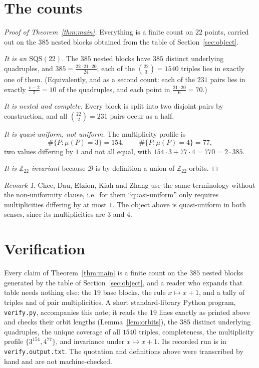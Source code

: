 \documentclass[11pt]{amsart}
\theoremstyle{remark}
\newtheorem{remark}[theorem]{Remark}
\newcommand{\SQS}{\mathrm{SQS}}
\newcommand{\Zn}[1]{\mathbb{Z}_{#1}}
\begin{document}
\section{The counts}

\begin{proof}[Proof of Theorem~\ref{thm:main}]
Everything is a finite count on $22$ points, carried out on the $385$ nested
blocks obtained from the table of Section~\ref{sec:object}.

\emph{It is an $\SQS(22)$.} The $385$ nested blocks have $385$ distinct
underlying quadruples, and $385=\frac{22\cdot21\cdot20}{24}$; each of the
$\binom{22}3=1540$ triples lies in exactly one of them. (Equivalently, and as a
second count: each of the $231$ pairs lies in exactly $\frac{v-2}2=10$ of the
quadruples, and each point in $\frac{21\cdot20}6=70$.)

\emph{It is nested and complete.} Every block is split into two disjoint pairs
by construction, and all $\binom{22}2=231$ pairs occur as a half.

\emph{It is quasi-uniform, not uniform.} The multiplicity profile is
\[
 \#\{P:\mu(P)=3\}=154,\qquad \#\{P:\mu(P)=4\}=77,
\]
two values differing by $1$ and not all equal, with
$154\cdot3+77\cdot4=770=2\cdot385$.

\emph{It is $\Zn{22}$-invariant} because $\mathcal B$ is by definition a union
of $\Zn{22}$-orbits.
\end{proof}

\begin{remark}
Chee, Dau, Etzion, Kiah and Zhang \cite{CDEKZ} use the same terminology without
the non-uniformity clause, i.e.\ for them ``quasi-uniform'' only requires
multiplicities differing by at most $1$. The object above is quasi-uniform in
both senses, since its multiplicities are $3$ and $4$.
\end{remark}

\section{Verification}

Every claim of Theorem~\ref{thm:main} is a finite count on the $385$ nested
blocks generated by the table of Section~\ref{sec:object}, and a reader who
expands that table needs nothing else: the $19$ base blocks, the rule
$x\mapsto x+1$, and a tally of triples and of pair multiplicities. A short
standard-library Python program, \texttt{verify.py}, accompanies this note; it
reads the $19$ lines exactly as printed above and checks their orbit lengths
(Lemma~\ref{lem:orbits}), the $385$ distinct underlying quadruples, the unique
coverage of all $1540$ triples, completeness, the multiplicity profile
$\{3^{154},4^{77}\}$, and invariance under $x\mapsto x+1$. Its recorded run is
in \texttt{verify.output.txt}. The quotation and definitions above were
transcribed by hand and are not machine-checked.
\end{document}
